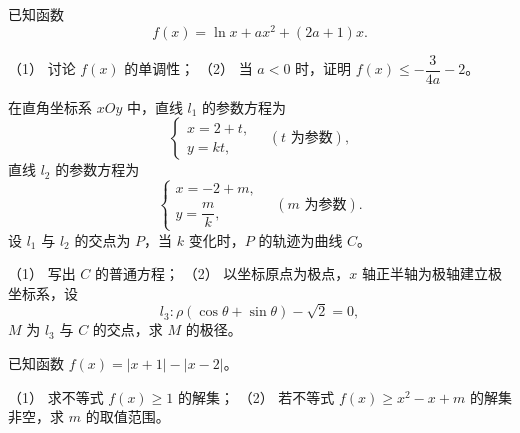 \begin{question}
已知函数
\nopagebreak[4]
\[
f(x)=\ln x+ax^2+(2a+1)x.
\]

（1） 讨论 \(f(x)\) 的单调性；
（2） 当 \(a<0\) 时，证明 \(f(x)\leq-\dfrac{3}{4a}-2\)。

\end{question}
\begin{question}
在直角坐标系 \(xOy\) 中，直线 \(l_1\) 的参数方程为
\nopagebreak[4]
\[
\begin{cases}
x=2+t,\\
y=kt,
\end{cases}
\quad(t\text{ 为参数}),
\]
直线 \(l_2\) 的参数方程为
\nopagebreak[4]
\[
\begin{cases}
x=-2+m,\\
y=\dfrac{m}{k},
\end{cases}
\quad(m\text{ 为参数}).
\]
设 \(l_1\) 与 \(l_2\) 的交点为 \(P\)，当 \(k\) 变化时，\(P\) 的轨迹为曲线 \(C\)。

（1） 写出 \(C\) 的普通方程；
（2） 以坐标原点为极点，\(x\) 轴正半轴为极轴建立极坐标系，设
\nopagebreak[4]
\[
l_3:\rho(\cos\theta+\sin\theta)-\sqrt{2}=0,
\]
\(M\) 为 \(l_3\) 与 \(C\) 的交点，求 \(M\) 的极径。

\end{question}
\begin{question}
已知函数 \(f(x)=|x+1|-|x-2|\)。

（1） 求不等式 \(f(x)\geq 1\) 的解集；
（2） 若不等式 \(f(x)\geq x^2-x+m\) 的解集非空，求 \(m\) 的取值范围。

\end{question}